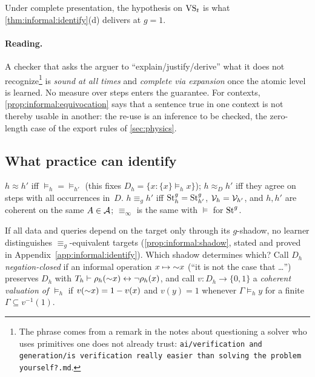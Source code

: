 Under complete presentation, the hypothesis on $\mathrm{VS}_t$ is what \cref{thm:informal:identify}(d) delivers at $g=1$.

\paragraph{Reading.}
A checker that asks the arguer to ``explain\slash justify\slash derive'' what it does not recognize\footnote{The phrase comes from a remark in the notes about questioning a solver who uses primitives one does not already trust: \texttt{ai/\allowbreak verification and generation/\allowbreak is verification really easier than solving the problem yourself?.md}.} is \emph{sound at all times} and \emph{complete via expansion} once the atomic level is learned. No measure over steps enters the guarantee. For contexts, \cref{prop:informal:equivocation} says that a sentence true in one context is not thereby usable in another: the re-use is an inference to be checked, the zero-length case of the export rules of \cref{sec:physics}.

\subsection{What practice can identify}\label{sec:informal:identify}

\begin{definition}[Equivalences]\label{def:informal:equiv}
$h\approx h'$ iff ${\models_h}={\models_{h'}}$ (this fixes $D_h=\{x:\{x\}\models_hx\}$); $h\approx_Dh'$ iff they agree on steps with all occurrences in~$D$. $h\equiv_gh'$ iff $\mathrm{St}^{g}_{h}=\mathrm{St}^{g}_{h'}$, $\mathcal V_{h}=\mathcal V_{h'}$, and $h,h'$ are coherent on the same $A\in\mathcal{A}$; $\equiv_\infty$ is the same with ${\models}$ for $\mathrm{St}^{g}_{}$.
\end{definition}

If all data and queries depend on the target only through its $g$-shadow, no learner distinguishes $\equiv_g$-equivalent targets (\cref{prop:informal:shadow}, stated and proved in Appendix~\ref{app:informal:identify}). Which shadow determines which? Call $D_h$ \emph{negation-closed} if an informal operation $x\mapsto{\sim} x$ (``it is not the case that \dots'') preserves $D_h$ with $T_h\vdash\rho_h({\sim} x)\leftrightarrow\neg\rho_h(x)$, and call $v:D_h\to\{0,1\}$ a \emph{coherent valuation of ${\models_h}$} if $v({\sim} x)=1-v(x)$ and $v(y)=1$ whenever $\Gamma\models_hy$ for a finite $\Gamma\subseteq v^{-1}(1)$.

